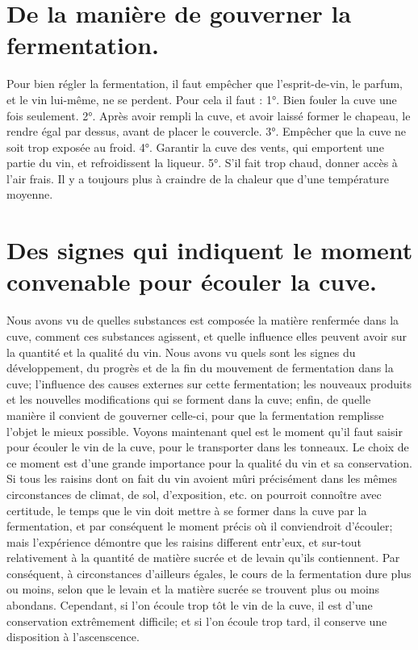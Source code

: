 \section{De la manière de gouverner la fermentation.}
Pour bien régler la fermentation, il faut empêcher que l’esprit-de-vin, le parfum, et le vin lui-même, ne se perdent. Pour cela il faut :
1°. Bien fouler la cuve une fois seulement.
2°. Après avoir rempli la cuve, et avoir laissé former le chapeau, le rendre égal par\setcounter{page}{142} dessus, avant de placer le couvercle.
3°. Empêcher que la cuve ne soit trop exposée au froid.
4°. Garantir la cuve des vents, qui emportent une partie du vin, et refroidissent la liqueur.
5°. S'il fait trop chaud, donner accès à l'air frais. Il y a toujours plus à craindre de la chaleur que d'une température moyenne.
\section{Des signes qui indiquent le moment convenable pour écouler la cuve.}
Nous avons vu de quelles substances est composée la matière renfermée dans la cuve, comment ces substances agissent, et quelle influence elles peuvent avoir sur la quantité et la qualité du vin. Nous avons vu quels sont les signes du développement, du progrès et de la fin du mouvement de fermentation dans la cuve; l'influence des causes externes sur cette fermentation; les nouveaux produits et les nouvelles modifications qui se forment dans la cuve; enfin, de quelle manière il convient de gouverner celle-ci, pour que la fermentation remplisse l'objet le mieux possible. Voyons maintenant quel est le moment qu'il faut saisir pour écouler le vin de la\setcounter{page}{143} cuve, pour le transporter dans les tonneaux. Le choix de ce moment est d'une grande importance pour la qualité du vin et sa conservation.
Si tous les raisins dont on fait du vin avoient mûri précisément dans les mêmes circonstances de climat, de sol, d'exposition, etc. on pourroit connoître avec certitude, le temps que le vin doit mettre à se former dans la cuve par la fermentation, et par conséquent le moment précis où il conviendroit d'écouler; mais l'expérience démontre que les raisins different entr'eux, et sur-tout relativement à la quantité de matière sucrée et de levain qu'ils contiennent. Par conséquent, à circonstances d'ailleurs égales, le cours de la fermentation dure plus ou moins, selon que le levain et la matière sucrée se trouvent plus ou moins abondans. Cependant, si l'on écoule trop tôt le vin de la cuve, il est d'une conservation extrêmement difficile; et si l'on écoule trop tard, il conserve une disposition à l'ascenscence.
